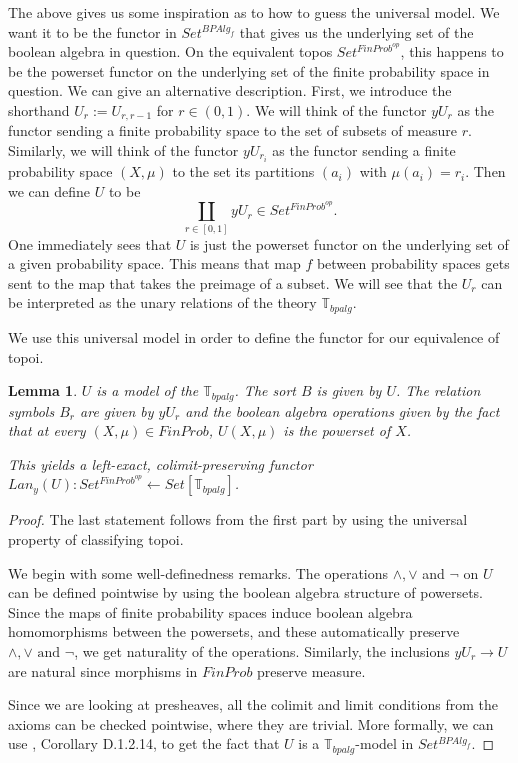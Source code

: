\documentclass[a4paper]{amsproc}
\theoremstyle{plain}
\newtheorem{lemma}[theorem]{Lemma}
\theoremstyle{definition}
\theoremstyle{remark}
\numberwithin{equation}{section}
\begin{document}
The above gives us some inspiration as to how to guess the universal model. We want it to be the functor in $Set^{BPAlg_f}$ that gives us the underlying set of the boolean algebra in question. On the equivalent topos $Set^{FinProb^{op}}$, this happens to be the powerset functor on the underlying set of the finite probability space in question. We can give an alternative description. First, we introduce the shorthand $U_r := U_{r,r-1}$ for $r \in (0,1)$. We will think of the functor $y U_r$ as the functor sending a finite probability space to the set of subsets of measure $r$. Similarly, we will think of the functor $y U_{r_i}$ as the functor sending a finite probability space $(X,\mu)$ to the set its partitions $(a_i)$ with $\mu(a_i) = r_i$. Then we can define $U$ to be
\[
\coprod_{r \in [0,1]} y U_r \in Set^{FinProb^{op}} .
\]
One immediately sees that $U$ is just the powerset functor on the underlying set of a given probability space. This means that map $f$ between probability spaces gets sent to the map that takes the preimage of a subset. We will see that the $U_r$ can be interpreted as the unary relations of the theory $\mathbb{T}_{bpalg}$.

We use this universal model in order to define the functor for our equivalence of topoi.

\begin{lemma} \label{universal model}
$U$ is a model of the $\mathbb{T}_{bpalg}$. The sort $B$ is given by $U$. The relation symbols $B_r$ are given by $y U_r$ and the boolean algebra operations given by the fact that at every $(X,\mu) \in FinProb$, $U(X, \mu)$ is the powerset of $X$.

This yields a left-exact, colimit-preserving functor $Lan_y(U): Set^{FinProb^{op}} \leftarrow Set[\mathbb{T}_{bpalg}]$.
\end{lemma}
\begin{proof}
The last statement follows from the first part by using the universal property of classifying topoi.

We begin with some well-definedness remarks. The operations $\wedge, \vee$ and $\neg$ on $U$ can be defined pointwise by using the boolean algebra structure of powersets. Since the maps of finite probability spaces induce boolean algebra homomorphisms between the powersets, and these automatically preserve $\wedge, \vee \text{ and } \neg$, we get naturality of the operations. Similarly, the inclusions $y U_r \to U$ are natural since morphisms in $FinProb$ preserve measure.

Since we are looking at presheaves, all the colimit and limit conditions from the axioms can be checked pointwise, where they are trivial. More formally, we can use \cite{elephant}, Corollary D.1.2.14, to get the fact that $U$ is a $\mathbb{T}_{bpalg}$-model in $Set^{BPAlg_f}$.
\end{proof}
\end{document}
